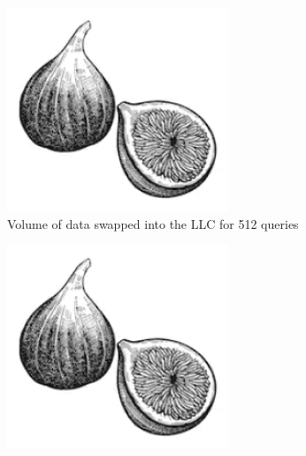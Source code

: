 \documentclass[lettersize,journal]{IEEEtran} %
\begin{document}
\begin{figure}[!t]
    \begin{subfigure}{0.3\columnwidth}
      \includegraphics[width=\linewidth]{fig1.png}
      \caption{Volume of data swapped into the LLC for 512 queries}
      \label{fig:subfig4}
    \end{subfigure}
    \hfill
    \begin{subfigure}{0.3\columnwidth}
      \includegraphics[width=\linewidth]{fig1.png}

\end{subfigure}
\end{figure}
\end{document}
